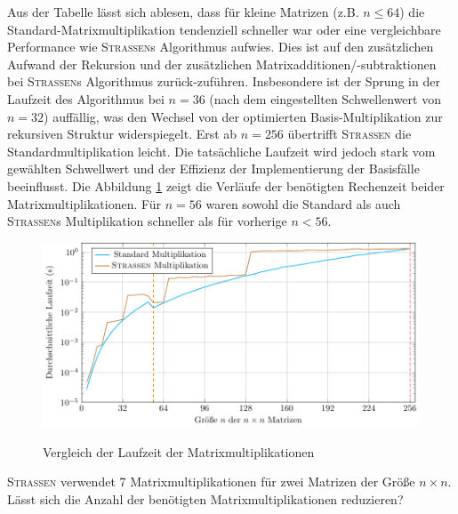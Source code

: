 \documentclass{scrartcl}
\numberwithin{equation}{section}
\begin{document}
Aus der Tabelle lässt sich ablesen, dass für kleine Matrizen (z.B. $n \le 64$) die Standard-Matrixmultiplikation tendenziell schneller war oder eine vergleichbare Performance wie \textsc{Strassen}s Algorithmus aufwies. Dies ist auf den zusätzlichen Aufwand der Rekursion und der zusätzlichen Matrixadditionen/-subtraktionen bei \textsc{Strassen}s Algorithmus zurück-zuführen. Insbesondere ist der Sprung in der Laufzeit des Algorithmus bei $n=36$ (nach dem eingestellten Schwellenwert von $n=32$) auffällig, was den Wechsel von der optimierten Basis-Multiplikation zur rekursiven Struktur widerspiegelt. Erst ab $n=256$ übertrifft \textsc{Strassen} die Standardmultiplikation leicht. Die tatsächliche Laufzeit wird jedoch stark vom gewählten Schwellwert und der Effizienz der Implementierung der Basisfälle beeinflusst. Die Abbildung \ref{fig:time-comparison} zeigt die Verläufe der benötigten Rechenzeit beider Matrixmultiplikationen. Für $n = 56$ waren sowohl die Standard als auch \textsc{Strassen}s Multiplikation schneller als für vorherige $n < 56$.

\begin{figure}[h]
	\centering
	\caption{Vergleich der Laufzeit der Matrixmultiplikationen}
	\includegraphics[width=1.0\textwidth]{results.pdf}
	\label{fig:time-comparison}
\end{figure}

\textsc{Strassen} verwendet 7 Matrixmultiplikationen für zwei Matrizen der Größe $n \times n$. Lässt sich die Anzahl der benötigten Matrixmultiplikationen reduzieren?
\end{document}
